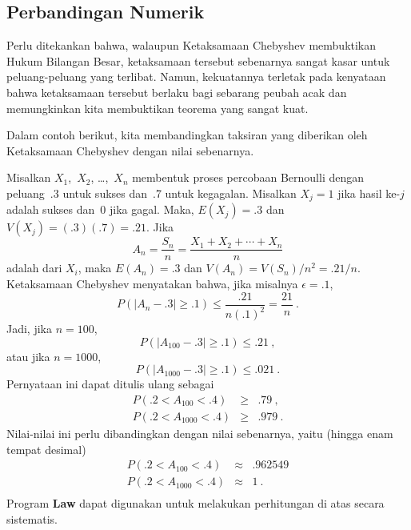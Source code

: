 \subsection*{Perbandingan Numerik}
Perlu ditekankan bahwa, walaupun Ketaksamaan Chebyshev membuktikan Hukum Bilangan
Besar, ketaksamaan tersebut sebenarnya sangat kasar untuk peluang-peluang yang terlibat.  Namun,
kekuatannya terletak pada kenyataan bahwa ketaksamaan tersebut berlaku bagi sebarang peubah acak dan memungkinkan
kita membuktikan teorema yang sangat kuat.
\par
Dalam contoh berikut, kita membandingkan taksiran yang diberikan oleh Ketaksamaan Chebyshev dengan
nilai sebenarnya.
\begin{example}
Misalkan $X_1$,~$X_2$, \dots,~$X_n$ membentuk proses percobaan Bernoulli dengan
peluang~.3 untuk sukses dan~.7 untuk kegagalan.  Misalkan $X_j = 1$ jika hasil ke-$j$
adalah sukses dan~0 jika gagal.  Maka, $E(X_j) = .3$ dan $V(X_j) =
(.3)(.7) = .21$.  Jika
$$
A_n = \frac {S_n}n = \frac {X_1 + X_2 +\cdots+ X_n}n
$$
adalah  dari $X_i$, maka $E(A_n) = .3$ dan $V(A_n) =
V(S_n)/n^2 = .21/n$.  Ketaksamaan Chebyshev menyatakan bahwa, jika misalnya
$\epsilon = .1$,
$$
P(|A_n - .3| \geq .1) \leq \frac {.21}{n(.1)^2} = \frac {21}n\ .
$$
Jadi, jika $n = 100$,
$$
P(|A_{100} - .3| \geq .1) \leq .21\ ,
$$
atau jika $n = 1000$,
$$
P(|A_{1000} - .3| \geq .1) \leq .021\ .
$$
Pernyataan ini dapat ditulis ulang sebagai
 \begin{eqnarray*}
P(.2 < A_{100} < .4) &\geq& .79\ , \\
P(.2 < A_{1000} < .4) &\geq& .979\ .
\end{eqnarray*} 
Nilai-nilai ini perlu dibandingkan dengan nilai sebenarnya, yaitu (hingga enam tempat
desimal)
\begin{eqnarray*}
P(.2 < A_{100} < .4) &\approx& .962549 \\
P(.2 < A_{1000} < .4) &\approx& 1\ .\\
\end{eqnarray*}
Program {\bf Law} dapat digunakan untuk melakukan perhitungan di atas secara
sistematis.
\end{example}


